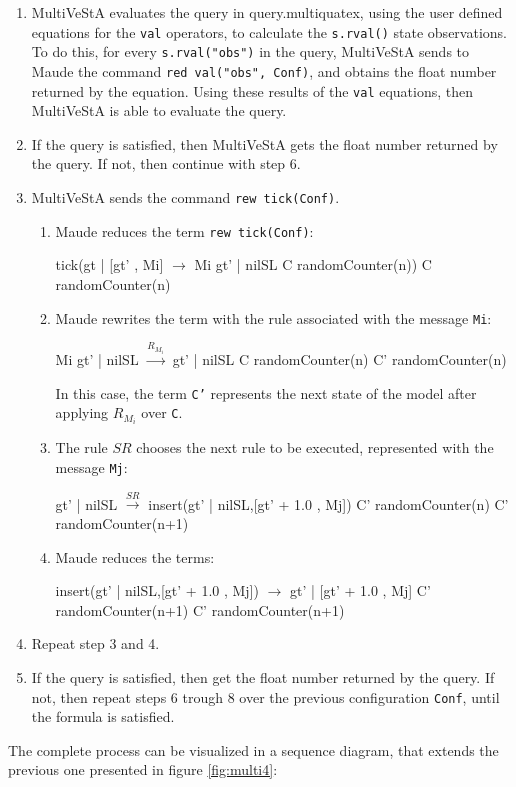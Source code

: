 \begin{enumerate}
\item MultiVeStA evaluates the query in query.multiquatex, using the user defined equations for the \texttt{val} operators, to calculate the \texttt{s.rval()} state observations. To do this, for every \texttt{s.rval("obs")} in the query, MultiVeStA sends to Maude the command \texttt{red val("obs", Conf)}, and obtains the float number returned by the equation. Using these results of the \texttt{val} equations, then MultiVeStA is able to evaluate the query.

\item If the query is satisfied, then MultiVeStA gets the float number returned by the query. If not, then continue with step 6.

\item MultiVeStA sends the command \texttt{rew tick(Conf)}.
    \begin{enumerate}
        \item Maude reduces the term \texttt{rew tick(Conf)}:
        \begin{maude}

tick({gt | [gt' , Mi]}     $\rightarrow$  Mi {gt' | nilSL }
     {C randomCounter(n)})    {C randomCounter(n)}\end{maude}
        \item Maude rewrites the term with the rule associated with the message \texttt{Mi}:
        \begin{maude}
        
Mi {gt' | nilSL}    $\xrightarrow{R_{M_i}}$ {gt' | nilSL }
{C randomCounter(n)}     {C'  randomCounter(n)}\end{maude}
        In this case, the term \texttt{C'} represents the next state of the model after applying $R_{M_i}$ over \texttt{C}.
        \item The rule $SR$ chooses the next rule to be executed, represented with the message \texttt{Mj}:
        \begin{maude}

{gt' | nilSL }        $\xrightarrow{SR}$   insert({gt' | nilSL},[gt' + 1.0 , Mj])
{C' randomCounter(n)}       {C' randomCounter(n+1)}\end{maude}
        
        \item Maude reduces the terms:
        \begin{maude}
        
insert({gt' | nilSL},[gt' + 1.0 , Mj]) $\rightarrow$ {gt' | [gt' + 1.0 , Mj]} 
{C' randomCounter(n+1)}                   {C' randomCounter(n+1)}\end{maude}
    \end{enumerate}

    \item Repeat step 3 and 4.
    
    \item If the query is satisfied, then get the float number returned by the query. If not, then repeat steps 6 trough 8 over the previous configuration \texttt{Conf}, until the formula is satisfied.
\end{enumerate}
The complete process can be visualized in a sequence diagram, that extends the previous one presented in figure \ref{fig:multi4}:

